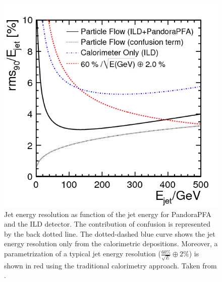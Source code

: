 \begin{figure}[htbp!]
  \centering
  \includegraphics[width=0.6\linewidth]{chap2/fig/pfa_figure_10.png}
  \caption{Jet energy resolution as function of the jet energy for PandoraPFA and the ILD detector. The contribution of confusion is represented by the back dotted line. The dotted-dashed blue curve shows the jet energy resolution only from the calorimetric depositions. Moreover, a parametrization of a typical jet energy resolution ($\frac{60\%}{\sqrt{E}} \oplus 2\%$) is shown in red using the traditional calorimetry approach. Taken from \cite{Thomson:2009rp}.} \label{fig:ILDPFA}
\end{figure}
